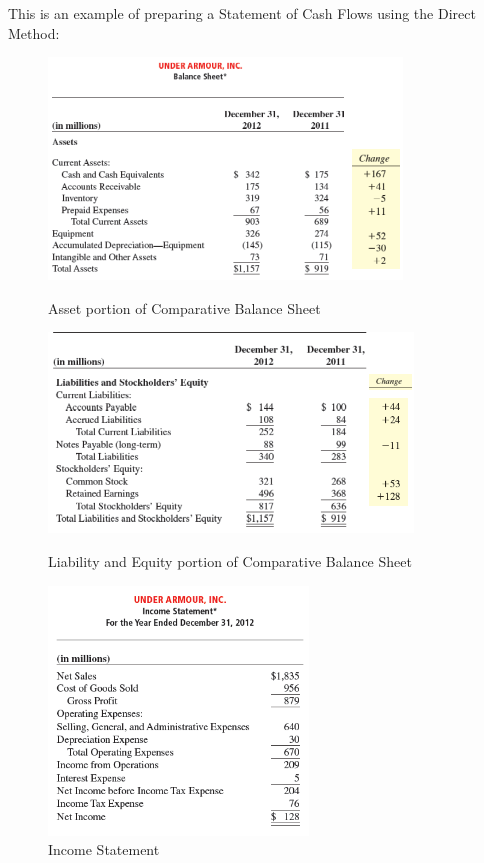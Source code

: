 \documentclass[../main.tex]{subfiles}
\begin{document}
	This is an example of preparing a Statement of Cash Flows using the Direct 
	Method:
	\begin{figure}[ht!]
		\centering
		\includegraphics[width=1\columnwidth]{images/c11/ua_comparative_bs.png}
		\caption{Asset portion of Comparative Balance Sheet}
		\includegraphics[width=1\columnwidth]{images/c11/ua_comparative_bs_liability_equity.png}
		\caption{Liability and Equity portion of Comparative Balance Sheet}
		\includegraphics[width=0.8\columnwidth]{images/c11/ua_income_statement.png}
		\caption{Income Statement}
	\end{figure}
	
\end{document}
